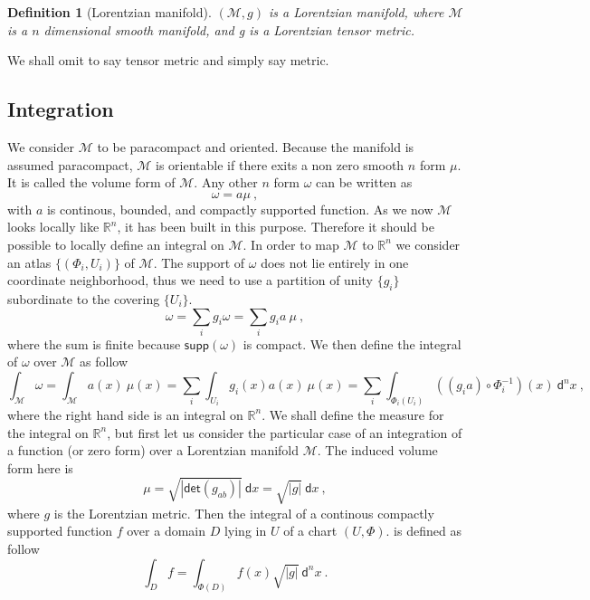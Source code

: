 \documentclass[10pt]{book}
\newcommand{\supp}{\mathsf{supp}}
\newcommand{\abs}[1]{\left|#1\right|}
\renewcommand{\det}{\mathsf{det}}
\let\int\int
\newcommand{\Mcal}{\mathcal{M}}
\newcommand{\Rbb}{\mathbb{R}}
\newcommand{\dsf}{\mathsf{d}}
\theoremstyle{break}
\newtheorem{definition}{Definition}
\begin{document}
\begin{definition}[Lorentzian manifold]
$(\Mcal,g)$ is a Lorentzian manifold, where $\Mcal$ is a $n$ dimensional smooth manifold, and g is a Lorentzian tensor metric.
\end{definition}


We shall omit to say tensor metric and simply say metric.


\subsection{Integration}


We consider $\Mcal$ to be paracompact and oriented. Because the manifold is assumed paracompact, $\Mcal$ is orientable if there exits a non zero smooth $n$ form $\mu$. It is called the volume form of $\Mcal$. Any other $n$ form $\omega$ can be written as 
%
\begin{equation*}
\omega = a \mu \ , 
\end{equation*}
%
with $a$ is continous, bounded, and compactly supported function. As we now $\Mcal$ looks locally like $\Rbb^n$, it has been built in this purpose. Therefore it should be possible to locally define an integral on $\Mcal$. In order to map $\Mcal$ to $\Rbb^n$ we consider an atlas $\{(\Phi_i,U_i)\}$ of $\Mcal$. The support of $\omega$ does not lie entirely in one coordinate neighborhood, thus we need to use a partition of unity $\{g_i\}$ subordinate to the covering $\{U_i\}$. 
%
\begin{equation*}
\omega = \sum_{i} g_i \omega = \sum_{i} g_i a \ \mu \ ,
\end{equation*}
%
where the sum is finite because $\supp(\omega)$ is compact. We then define the integral of $\omega$ over $\Mcal$ as follow
%
\begin{equation*}
\int_\Mcal \omega = \int_\Mcal a(x) \ \mu(x) = \sum_i \int_{U_i} g_i(x) a(x) \ \mu(x) = \sum_i \int_{\Phi_i(U_i)} \left( (g_i a) \circ \Phi_i^{-1} \right)(x) \ \dsf^n x \ ,
\label{eq:int-manifold}
\end{equation*}
%
where the right hand side is an integral on $\Rbb^n$. We shall define the measure for the integral on $\Rbb^n$, but first let us consider the particular case of an integration of a function (or zero form) over a Lorentzian manifold $\Mcal$. The induced volume form here is
%
\begin{equation*}
\mu = \sqrt{\abs{\det\left(g_{ab}\right)}} \ \dsf x = \sqrt{\abs{g}} \ \dsf x \ ,
\end{equation*}
%
where $g$ is the Lorentzian metric. Then the integral of a continous compactly supported function $f$ over a domain $D$ lying in $U$ of a chart $(U,\Phi)$. is defined as follow
%
\begin{equation*}
\int_D f = \int_{\Phi(D)} f(x) \sqrt{\abs{g}} \ \dsf^n x \ .
\end{equation*}
\end{document}
